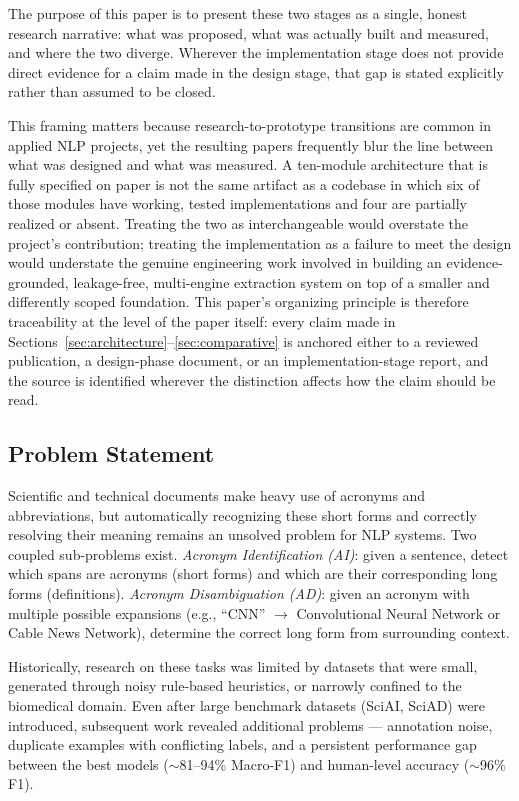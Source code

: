 \documentclass[10pt,conference]{IEEEtran}
\begin{document}
The purpose of this paper is to present these two stages as a single, honest research narrative: what was proposed, what was actually built and measured, and where the two diverge. Wherever the implementation stage does not provide direct evidence for a claim made in the design stage, that gap is stated explicitly rather than assumed to be closed.

This framing matters because research-to-prototype transitions are common in applied NLP projects, yet the resulting papers frequently blur the line between what was designed and what was measured. A ten-module architecture that is fully specified on paper is not the same artifact as a codebase in which six of those modules have working, tested implementations and four are partially realized or absent. Treating the two as interchangeable would overstate the project's contribution; treating the implementation as a failure to meet the design would understate the genuine engineering work involved in building an evidence-grounded, leakage-free, multi-engine extraction system on top of a smaller and differently scoped foundation. This paper's organizing principle is therefore traceability at the level of the paper itself: every claim made in Sections~\ref{sec:architecture}--\ref{sec:comparative} is anchored either to a reviewed publication, a design-phase document, or an implementation-stage report, and the source is identified wherever the distinction affects how the claim should be read.

\subsection{Problem Statement}
Scientific and technical documents make heavy use of acronyms and abbreviations, but automatically recognizing these short forms and correctly resolving their meaning remains an unsolved problem for NLP systems. Two coupled sub-problems exist. \emph{Acronym Identification (AI)}: given a sentence, detect which spans are acronyms (short forms) and which are their corresponding long forms (definitions). \emph{Acronym Disambiguation (AD)}: given an acronym with multiple possible expansions (e.g., ``CNN'' $\rightarrow$ Convolutional Neural Network or Cable News Network), determine the correct long form from surrounding context.

Historically, research on these tasks was limited by datasets that were small, generated through noisy rule-based heuristics, or narrowly confined to the biomedical domain. Even after large benchmark datasets (SciAI, SciAD) were introduced, subsequent work revealed additional problems --- annotation noise, duplicate examples with conflicting labels, and a persistent performance gap between the best models ($\sim$81--94\% Macro-F1) and human-level accuracy ($\sim$96\% F1).
\end{document}
